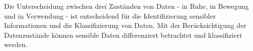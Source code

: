 Die Unterscheidung zwischen drei Zuständen von Daten - in Ruhe, in Bewegung und in Verwendung - ist entscheidend für die Identifizierung sensibler Informationen und die Klassifizierung von Daten. Mit der Berücksichtigung der Datenzustände können sensible Daten differenziert betrachtet und klassifiziert werden.


